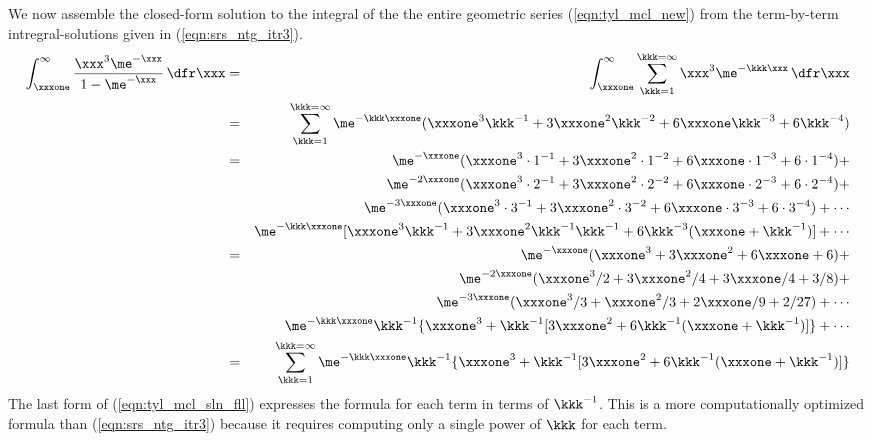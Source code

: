 \documentclass[12pt]{article}
\begin{document}
We now assemble the closed-form solution to the integral of the 
the entire geometric series (\ref{eqn:tyl_mcl_new}) from the term-by-term intregral-solutions given in (\ref{eqn:srs_ntg_itr3}).
\begin{eqnarray}
\int_{\xxxone}^{\infty} 
\frac{\xxx^{3}\me^{-\xxx}}{1 - \me^{-\xxx}} \,\dfr\xxx
 & = &
\int_{\xxxone}^{\infty} \sum_{\kkk=1}^{\kkk=\infty} \xxx^{3}\me^{-\kkk\xxx} \, \dfr\xxx \nonumber \\
 & = &
\sum_{\kkk=1}^{\kkk=\infty} \me^{-\kkk\xxxone}(\xxxone^{3}\kkk^{-1} + 3\xxxone^{2}\kkk^{-2} + 6\xxxone\kkk^{-3} + 6\kkk^{-4}) \nonumber \\
 & = &
\me^{-\xxxone}(\xxxone^{3}\cdot 1^{-1} + 3\xxxone^{2}\cdot 1^{-2} + 6\xxxone\cdot  1^{-3} + 6\cdot 1^{-4}) + \nonumber \\
 & &
\me^{-2\xxxone}(\xxxone^{3}\cdot 2^{-1} + 3\xxxone^{2}\cdot 2^{-2} + 6\xxxone\cdot  2^{-3} + 6\cdot 2^{-4}) + \nonumber \\
 & &
\me^{-3\xxxone}(\xxxone^{3}\cdot 3^{-1} + 3\xxxone^{2}\cdot 3^{-2} + 6\xxxone\cdot  3^{-3} + 6\cdot 3^{-4}) + \cdots \nonumber \\
 & &
\me^{-\kkk\xxxone}[\xxxone^{3}\kkk^{-1} + 3\xxxone^{2}\kkk^{-1}\kkk^{-1} + 6\kkk^{-3}(\xxxone + \kkk^{-1})] + \cdots \nonumber \\
 & = &
\me^{-\xxxone}(\xxxone^{3} + 3\xxxone^{2} + 6\xxxone + 6) + \nonumber \\
 & &
\me^{-2\xxxone}(\xxxone^{3}/2 + 3\xxxone^{2}/4 + 3\xxxone/4 + 3/8) + \nonumber \\
 & &
\me^{-3\xxxone}(\xxxone^{3}/3 + \xxxone^{2}/3 + 2\xxxone/9 + 2/27) + \cdots \nonumber \\
 & &
\me^{-\kkk\xxxone}\kkk^{-1}\{\xxxone^{3} + \kkk^{-1}[3\xxxone^{2} + 6\kkk^{-1}(\xxxone + \kkk^{-1})]\} + \cdots \nonumber \\
 & = &
\sum_{\kkk=1}^{\kkk=\infty} \me^{-\kkk\xxxone}\kkk^{-1}\{\xxxone^{3} + \kkk^{-1}[3\xxxone^{2} + 6\kkk^{-1}(\xxxone + \kkk^{-1})]\}
\label{eqn:tyl_mcl_sln_fll}
\end{eqnarray}
The last form of (\ref{eqn:tyl_mcl_sln_fll}) expresses the formula for each term in terms of $\kkk^{-1}$.
This is a more computationally optimized formula than (\ref{eqn:srs_ntg_itr3}) because it requires computing only a single power of $\kkk$ for each term.
\end{document}
